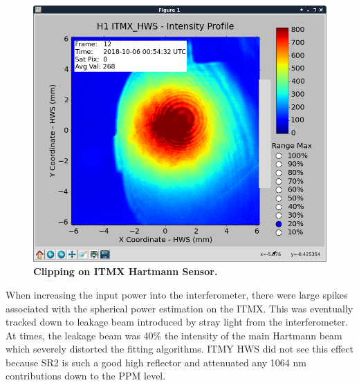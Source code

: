 	\begin{figure}[t!]
		\centering
		\includegraphics[width=0.4\textheight]{../Figures/ITMX_HWS_clipping.png}
		\caption[Clipping on ITMX Hartmann Sensor.] 
		{\textbf{Clipping on ITMX Hartmann Sensor.}
		}
		\label{fig:ITMX_clipping}
	\end{figure}
	
	When increasing the input power into the interferometer, there were large spikes associated with the spherical power estimation on the ITMX.  This was eventually tracked down to leakage beam introduced by stray light from the interferometer.  At times, the leakage beam was 40\% the intensity of the main Hartmann beam which severely distorted the fitting algorithms. ITMY HWS did not see this effect because SR2 is such a good high reflector and attenuated any 1064 nm contributions down to the PPM level.
	
